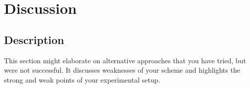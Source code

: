 \section{Discussion}
\label{sec:discussion}
\subsection{Description}
This section might elaborate on alternative approaches that
you have tried, but were not successful. It discusses weaknesses
of your scheme and highlights the strong and weak
points of your experimental setup.

